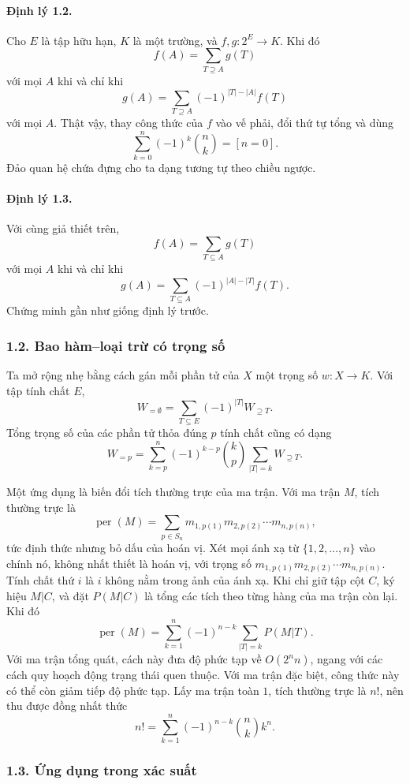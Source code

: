 \documentclass[11pt]{article}
\begin{document}
\paragraph{Định lý 1.2.}
Cho \(E\) là tập hữu hạn, \(K\) là một trường, và
\(f,g:2^E\to K\). Khi đó
\[
f(A)=\sum_{T\supseteq A}g(T)
\]
với mọi \(A\) khi và chỉ khi
\[
g(A)=\sum_{T\supseteq A}(-1)^{|T|-|A|}f(T)
\]
với mọi \(A\). Thật vậy, thay công thức của \(f\) vào vế phải, đổi thứ tự tổng
và dùng
\[
\sum_{k=0}^n(-1)^k\binom nk=[n=0].
\]
Đảo quan hệ chứa đựng cho ta dạng tương tự theo chiều ngược.

\paragraph{Định lý 1.3.}
Với cùng giả thiết trên,
\[
f(A)=\sum_{T\subseteq A}g(T)
\]
với mọi \(A\) khi và chỉ khi
\[
g(A)=\sum_{T\subseteq A}(-1)^{|A|-|T|}f(T).
\]
Chứng minh gần như giống định lý trước.

\subsubsection*{1.2. Bao hàm--loại trừ có trọng số}

Ta mở rộng nhẹ bằng cách gán mỗi phần tử của \(X\) một trọng số
\(w:X\to K\). Với tập tính chất \(E\),
\[
W_{=\emptyset}=\sum_{T\subseteq E}(-1)^{|T|}W_{\supseteq T}.
\]
Tổng trọng số của các phần tử thỏa đúng \(p\) tính chất cũng có dạng
\[
W_{=p}=\sum_{k=p}^n(-1)^{k-p}\binom kp
\sum_{|T|=k}W_{\supseteq T}.
\]

Một ứng dụng là biến đổi tích thường trực của ma trận. Với ma trận \(M\), tích
thường trực là
\[
\operatorname{per}(M)=\sum_{p\in S_n}m_{1,p(1)}m_{2,p(2)}\cdots m_{n,p(n)},
\]
tức định thức nhưng bỏ dấu của hoán vị. Xét mọi ánh xạ từ
\(\{1,2,\ldots,n\}\) vào chính nó, không nhất thiết là hoán vị, với trọng số
\(m_{1,p(1)}m_{2,p(2)}\cdots m_{n,p(n)}\). Tính chất thứ \(i\) là \(i\) không
nằm trong ảnh của ánh xạ. Khi chỉ giữ tập cột \(C\), ký hiệu \(M|C\), và đặt
\(P(M|C)\) là tổng các tích theo từng hàng của ma trận còn lại. Khi đó
\[
\operatorname{per}(M)=
\sum_{k=1}^n(-1)^{n-k}\sum_{|T|=k}P(M|T).
\]
Với ma trận tổng quát, cách này đưa độ phức tạp về \(O(2^n n)\), ngang với các
cách quy hoạch động trạng thái quen thuộc. Với ma trận đặc biệt, công thức này
có thể còn giảm tiếp độ phức tạp. Lấy ma trận toàn \(1\), tích thường trực là
\(n!\), nên thu được đồng nhất thức
\[
n!=\sum_{k=1}^n(-1)^{n-k}\binom nk k^n.
\]

\subsubsection*{1.3. Ứng dụng trong xác suất}
\end{document}
